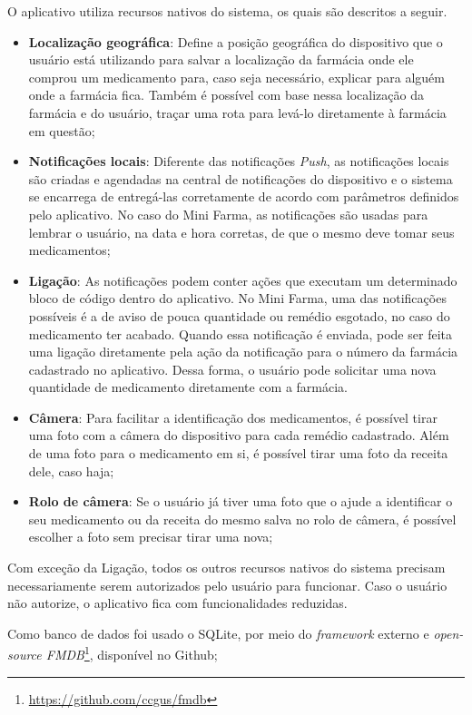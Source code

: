 O aplicativo utiliza recursos nativos do sistema, os quais são descritos a seguir. 
\begin{itemize}
	\item \textbf{Localização geográfica}: Define a posição geográfica do dispositivo que o usuário está utilizando para salvar a 
    localização da farmácia onde ele comprou um medicamento para, caso seja necessário, explicar para alguém onde a 
    farmácia fica. Também é possível com base nessa localização da farmácia e do usuário, traçar uma rota para levá-lo diretamente à 
    farmácia em questão;
	\item \textbf{Notificações locais}: Diferente das notificações \textit{Push}, as notificações locais são criadas e agendadas na central 
    de notificações do dispositivo e o sistema se encarrega de entregá-las corretamente de acordo com parâmetros definidos pelo aplicativo. 
    No caso do Mini Farma, as notificações são usadas para lembrar o usuário, na data e hora corretas, de que o mesmo deve tomar seus medicamentos;
	\item \textbf{Ligação}: As notificações podem conter ações que executam um determinado bloco de código dentro do aplicativo. No Mini Farma, 
    uma das notificações possíveis é a de aviso de pouca quantidade ou remédio esgotado, no caso do medicamento ter acabado. 
    Quando essa notificação é enviada, pode ser feita uma ligação diretamente pela ação da notificação para o número da 
    farmácia cadastrado no aplicativo. Dessa forma, o usuário pode solicitar uma nova quantidade de medicamento diretamente com a farmácia. 
	\item \textbf{Câmera}: Para facilitar a identificação dos medicamentos, é possível tirar uma foto com a câmera do dispositivo para 
    cada remédio cadastrado. Além de uma foto para o medicamento em si, é possível tirar uma foto da receita dele, caso haja;
    \item \textbf{Rolo de câmera}: Se o usuário já tiver uma foto que o ajude a identificar o seu medicamento ou da receita do mesmo salva 
    no rolo de câmera, é possível escolher a foto sem precisar tirar uma nova;
\end{itemize}

Com exceção da Ligação, todos os outros recursos nativos do sistema precisam necessariamente serem autorizados pelo
usuário para funcionar. Caso o usuário não autorize, o aplicativo fica com funcionalidades reduzidas.

Como banco de dados foi usado o SQLite, por meio do \textit{framework} externo e \textit{open-source FMDB}\footnote{\url{https://github.com/ccgus/fmdb}}, 
disponível no Github;

